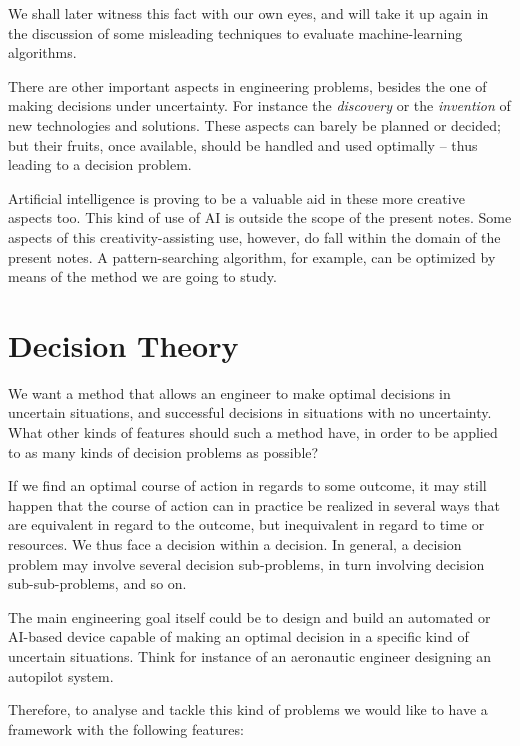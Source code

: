 \documentclass[
  a4paper,
  DIV=11,
  numbers=noendperiod,
  oneside]{scrreprt}
\begin{document}
We shall later witness this fact with our own eyes, and will take it up
again in the discussion of some misleading techniques to evaluate
machine-learning algorithms.

\hfill\break

There are other important aspects in engineering problems, besides the
one of making decisions under uncertainty. For instance the
\emph{discovery} or the \emph{invention} of new technologies and
solutions. These aspects can barely be planned or decided; but their
fruits, once available, should be handled and used optimally -- thus
leading to a decision problem.

Artificial intelligence is proving to be a valuable aid in these more
creative aspects too. This kind of use of AI is outside the scope of the
present notes. Some aspects of this creativity-assisting use, however,
do fall within the domain of the present notes. A pattern-searching
algorithm, for example, can be optimized by means of the method we are
going to study.

\hypertarget{decision-theory}{%
\section{Decision Theory}\label{decision-theory}}

We want a method that allows an engineer to make optimal decisions in
uncertain situations, and successful decisions in situations with no
uncertainty. What other kinds of features should such a method have, in
order to be applied to as many kinds of decision problems as possible?

If we find an optimal course of action in regards to some outcome, it
may still happen that the course of action can in practice be realized
in several ways that are equivalent in regard to the outcome, but
inequivalent in regard to time or resources. We thus face a decision
within a decision. In general, a decision problem may involve several
decision sub-problems, in turn involving decision sub-sub-problems, and
so on.

The main engineering goal itself could be to design and build an
automated or AI-based device capable of making an optimal decision in a
specific kind of uncertain situations. Think for instance of an
aeronautic engineer designing an autopilot system.

Therefore, to analyse and tackle this kind of problems we would like to
have a framework with the following features:
\end{document}
